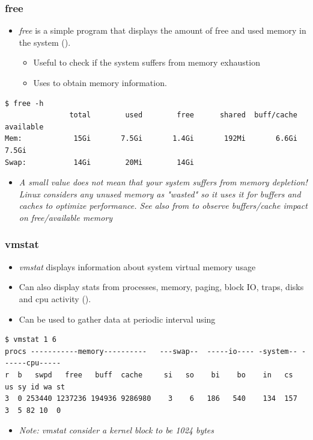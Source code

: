 \begin{frame}[fragile]
  \frametitle{free}
  \begin{itemize}
    \item {\em free} is a simple program that displays the amount of free and
          used memory in the system ().
    \begin{itemize}
      \item Useful to check if the system suffers from memory exhaustion
      \item Uses  to obtain memory information.
    \end{itemize}
  \end{itemize}
  \begin{block}{}
    \begin{verbatim}
$ free -h
               total        used        free      shared  buff/cache   available
Mem:            15Gi       7.5Gi       1.4Gi       192Mi       6.6Gi       7.5Gi
Swap:           14Gi        20Mi        14Gi
    \end{verbatim}
  \end{block}
  \begin{itemize}
    \item {\em A small  value does not mean that your system suffers
    from memory depletion! Linux considers any unused memory as "wasted" so
    it uses it for buffers and caches to optimize performance. See also
     from  to observe buffers/cache
    impact on free/available memory}
  \end{itemize}
\end{frame}

\begin{frame}[fragile]
  \frametitle{vmstat}
  \begin{itemize}
    \item {\em vmstat} displays information about system virtual memory usage
    \item Can also display stats from processes, memory, paging, block IO,
          traps, disks and cpu activity ().
    \item Can be used to gather data at periodic interval using 
  \end{itemize}
  \begin{block}{}
    \begin{verbatim}
$ vmstat 1 6
procs -----------memory----------   ---swap--  -----io---- -system-- ------cpu-----
r  b   swpd   free   buff  cache     si   so    bi    bo    in   cs  us sy id wa st
3  0 253440 1237236 194936 9286980    3    6   186   540    134  157  3  5 82 10  0
    \end{verbatim}
  \end{block}
  \begin{itemize}
    \item {\em Note: vmstat consider a kernel block to be 1024 bytes}
  \end{itemize}
\end{frame}

